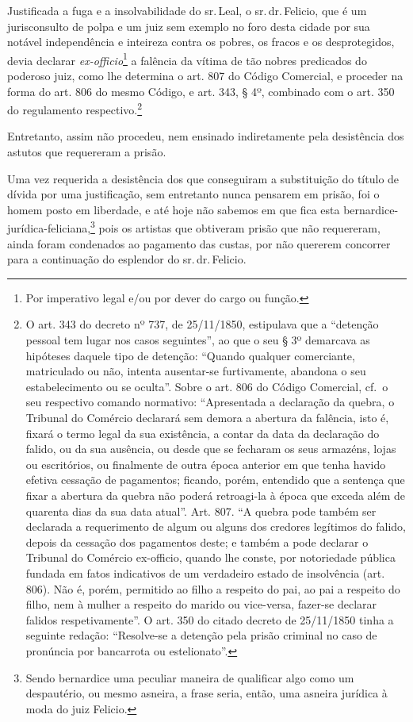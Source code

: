 Justificada a fuga e a insolvabilidade do sr.\,Leal, o sr.\,dr.\,Felicio,
que é um jurisconsulto de polpa e um juiz sem exemplo no foro desta
cidade por sua notável independência e inteireza contra os pobres, os
fracos e os desprotegidos, devia declarar \emph{ex-officio}\footnote{
  Por imperativo legal e/ou por dever do cargo ou função.} a falência da
vítima de tão nobres predicados do poderoso juiz, como lhe determina o
art. 807 do Código Comercial, e proceder na forma do art. 806 do mesmo
Código, e art. 343, § 4º, combinado com o art. 350 do regulamento
respectivo.\footnote{ O art. 343 do decreto nº 737, de 25/11/1850,
  estipulava que a ``detenção pessoal tem lugar nos casos seguintes'', ao
  que o seu § 3º demarcava as hipóteses daquele tipo de detenção:
  ``Quando qualquer comerciante, matriculado ou não, intenta ausentar-se
  furtivamente, abandona o seu estabelecimento ou se oculta''. Sobre o
  art. 806 do Código Comercial, cf.~o seu respectivo comando normativo:
  ``Apresentada a declaração da quebra, o Tribunal do Comércio declarará
  sem demora a abertura da falência, isto é, fixará o termo legal da sua
  existência, a contar da data da declaração do falido, ou da sua
  ausência, ou desde que se fecharam os seus armazéns, lojas ou
  escritórios, ou finalmente de outra época anterior em que tenha havido
  efetiva cessação de pagamentos; ficando, porém, entendido que a
  sentença que fixar a abertura da quebra não poderá retroagi-la à época
  que exceda além de quarenta dias da sua data atual''. Art. 807. ``A
  quebra pode também ser declarada a requerimento de algum ou alguns dos
  credores legítimos do falido, depois da cessação dos pagamentos deste;
  e também a pode declarar o Tribunal do Comércio ex-officio, quando lhe
  conste, por notoriedade pública fundada em fatos indicativos de um
  verdadeiro estado de insolvência (art. 806). Não é, porém, permitido
  ao filho a respeito do pai, ao pai a respeito do filho, nem à mulher a
  respeito do marido ou vice-versa, fazer-se declarar falidos
  respetivamente''. O art. 350 do citado decreto de 25/11/1850 tinha a
  seguinte redação: ``Resolve-se a detenção pela prisão criminal no caso
  de pronúncia por bancarrota ou estelionato''.}

Entretanto, assim não procedeu, nem ensinado indiretamente pela
desistência dos astutos que requereram a prisão.

Uma vez requerida a desistência dos que conseguiram a substituição do
título de dívida por uma justificação, sem entretanto nunca pensarem em
prisão, foi o homem posto em liberdade, e até hoje não sabemos em que
fica esta bernardice-jurídica-feliciana,\footnote{ Sendo bernardice uma
  peculiar maneira de qualificar algo como um despautério, ou mesmo
  asneira, a frase seria, então, uma asneira jurídica à moda do juiz
  Felicio.} pois os artistas que obtiveram prisão que não requereram,
ainda foram condenados ao pagamento das custas, por não quererem
concorrer para a continuação do esplendor do sr.\,dr.\,Felicio.

